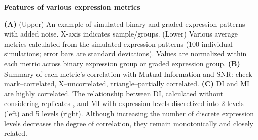 \textbf{Features of various expression metrics}

\textbf{(A)} (Upper) An example of simulated binary and graded expression patterns with added noise. X-axis indicates sample/groups. (Lower) Various average metrics calculated from the simulated expression patterns (100 individual simulations; error bars are standard deviations). Values are normalized within each metric across binary expression group or graded expression group. 
\textbf{(B)} Summary of each metric's correlation with Mutual Information and SNR: check mark--correlated, X--uncorrelated, triangle--partially correlated.
\textbf{(C)} DI and MI are highly correlated. The relationship between DI, calculated without considering replicates%
, and MI with expression levels discretized into 2 levels (left) and 5 levels (right). Although increasing the number of discrete expression levels decreases the degree of correlation, they remain monotonically and closely related.

